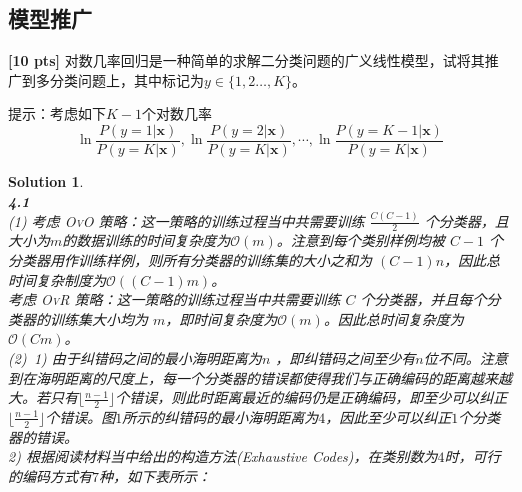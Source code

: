 \documentclass[a4paper,UTF8]{article}
\numberwithin{equation}{section}
\newtheorem*{solution}{Solution}
\begin{document}
\subsection{模型推广}
\textbf{[10 pts]} 对数几率回归是一种简单的求解二分类问题的广义线性模型，试将其推广到多分类问题上，其中标记为$y\in\{1,2\dots,K\}$。

提示：考虑如下$K-1$个对数几率
$$\ln\frac{P(y=1|\mathbf{x})}{P(y=K|\mathbf{x})},	\ln\frac{P(y=2|\mathbf{x})}{P(y=K|\mathbf{x})},\cdots,	\ln\frac{P(y=K-1|\mathbf{x})}{P(y=K|\mathbf{x})}$$

\begin{solution}
~\\\textbf{4.1}
\\\textsc{(1)} 考虑 \textsc{OvO} 策略：这一策略的训练过程当中共需要训练 $\frac{C(C-1)}{2}$ 个分类器，且大小为$m$的数据训练的时间复杂度为$ \mathcal{O}(m) $。注意到每个类别样例均被 $C-1$ 个分类器用作训练样例，则所有分类器的训练集的大小之和为 $(C-1)n$，因此总时间复杂制度为$ \mathcal{O}((C-1)m) $。\\
考虑 \textsc{OvR} 策略：这一策略的训练过程当中共需要训练 $C$ 个分类器，并且每个分类器的训练集大小均为 $m$，即时间复杂度为$ \mathcal{O}(m) $。因此总时间复杂度为$ \mathcal{O}(Cm) $。\\
\textsc{(2)}\, \textsc{1)} 由于纠错码之间的最小海明距离为$n$ ，即纠错码之间至少有$n$位不同。注意到在海明距离的尺度上，每一个分类器的错误都使得我们与正确编码的距离越来越大。若只有$\lfloor \frac{n-1}{2}\rfloor$个错误，则此时距离最近的编码仍是正确编码，即至少可以纠正$\lfloor \frac{n-1}{2}\rfloor$个错误。图$1$所示的纠错码的最小海明距离为$4$，因此至少可以纠正$1$个分类器的错误。\\ 
\indent\textsc{2)} 根据阅读材料\textsc{\cite{dietterich1994solving}}当中给出的构造方法(Exhaustive Codes)，在类别数为$4$时，可行的编码方式有$7$种，如下表所示：
\begin{table}[!htbp]
\centering
{}
\end{table}
\end{solution}
\end{document}
